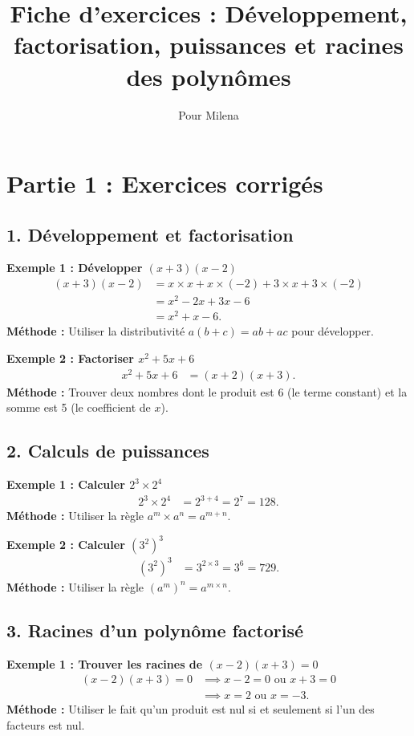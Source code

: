 \documentclass[a4paper,12pt]{article}
\title{Fiche d'exercices : Développement, factorisation, puissances et racines des polynômes}
\author{Pour Milena}
\date{}
\begin{document}
\maketitle

\section*{Partie 1 : Exercices corrigés}

\subsection*{1. Développement et factorisation}
\textbf{Exemple 1 : Développer $(x+3)(x-2)$}
\begin{align*}
  (x+3)(x-2) &= x \times x + x \times (-2) + 3 \times x + 3 \times (-2) \\
             &= x^2 - 2x + 3x - 6 \\
             &= x^2 + x - 6.
\end{align*}
\textbf{Méthode :} Utiliser la distributivité $a(b+c) = ab + ac$ pour développer.

\textbf{Exemple 2 : Factoriser $x^2 + 5x + 6$}
\begin{align*}
  x^2 + 5x + 6 &= (x+2)(x+3).
\end{align*}
\textbf{Méthode :} Trouver deux nombres dont le produit est 6 (le terme constant) et la somme est 5 (le coefficient de $x$).

\subsection*{2. Calculs de puissances}
\textbf{Exemple 1 : Calculer $2^3 \times 2^4$}
\begin{align*}
  2^3 \times 2^4 &= 2^{3+4} = 2^7 = 128.
\end{align*}
\textbf{Méthode :} Utiliser la règle $a^m \times a^n = a^{m+n}$.

\textbf{Exemple 2 : Calculer $(3^2)^3$}
\begin{align*}
  (3^2)^3 &= 3^{2 \times 3} = 3^6 = 729.
\end{align*}
\textbf{Méthode :} Utiliser la règle $(a^m)^n = a^{m \times n}$.

\subsection*{3. Racines d'un polynôme factorisé}
\textbf{Exemple 1 : Trouver les racines de $(x-2)(x+3) = 0$}
\begin{align*}
  (x-2)(x+3) = 0 &\implies x-2=0 \text{ ou } x+3=0 \\
  &\implies x=2 \text{ ou } x=-3.
\end{align*}
\textbf{Méthode :} Utiliser le fait qu'un produit est nul si et seulement si l'un des facteurs est nul.
\end{document}
